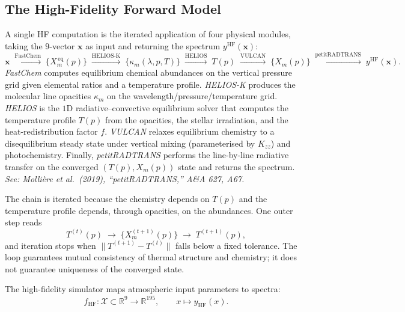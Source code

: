 \documentclass[11pt,a4paper]{article}
\newcommand{\litref}[1]{{\color{violet}\textit{See: #1}}}
\newcommand{\xv}{\bm{x}}
\newcommand{\fhr}{f}
\newcommand{\yhf}{y^{\mathrm{HF}}}
\begin{document}
\subsection{The High-Fidelity Forward Model}
A single HF computation is the iterated application of four physical
modules, taking the $9$-vector $\xv$ as input and returning the
spectrum $\yhf(\xv)$:
\[
\xv \;\xrightarrow{\text{FastChem}}\; \{X_{m}^{\,\mathrm{eq}}(p)\}
\;\xrightarrow{\text{HELIOS-K}}\; \{\kappa_{m}(\lambda,p,T)\}
\;\xrightarrow{\text{HELIOS}}\; T(p)
\;\xrightarrow{\text{VULCAN}}\; \{X_{m}(p)\}
\;\xrightarrow{\text{petitRADTRANS}}\; \yhf(\xv).
\]
\emph{FastChem} computes equilibrium chemical abundances on the
vertical pressure grid given elemental ratios and a temperature
profile. \emph{HELIOS-K} produces the molecular line opacities
$\kappa_{m}$ on the wavelength/pressure/temperature grid. \emph{HELIOS}
is the $1$D radiative--convective equilibrium solver that computes the
temperature profile $T(p)$ from the opacities, the stellar irradiation,
and the heat-redistribution factor $\fhr$. \emph{VULCAN} relaxes
equilibrium chemistry to a disequilibrium steady state under vertical
mixing (parameterised by $K_{zz}$) and photochemistry. Finally,
\emph{petitRADTRANS} performs the line-by-line radiative transfer on
the converged $(T(p),X_{m}(p))$ state and returns the spectrum.
\litref{Mollière et al.~(2019), ``petitRADTRANS,'' A\&A 627, A67.}

The chain is iterated because the chemistry depends on $T(p)$ and the
temperature profile depends, through opacities, on the abundances. One
outer step reads
\[
T^{(t)}(p) \;\longrightarrow\; \{X_{m}^{(t+1)}(p)\}
\;\longrightarrow\; T^{(t+1)}(p),
\]
and iteration stops when $\|T^{(t+1)}-T^{(t)}\|$ falls below a fixed
tolerance. The loop guarantees mutual consistency of thermal structure
and chemistry; it does not guarantee uniqueness of the converged
state.


The high-fidelity simulator maps atmospheric input parameters to spectra:
\[
f_{\mathrm{HF}}:\mathcal X\subset\mathbb R^9\to\mathbb R^{195},
\qquad
x\mapsto y_{\mathrm{HF}}(x).
\]
\end{document}

